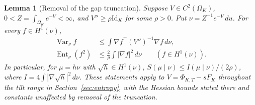 \documentclass[11pt,reqno]{amsart}
\numberwithin{equation}{section}
\newtheorem{lemma}[theorem]{Lemma}
\theoremstyle{definition}
\theoremstyle{remark}
\newcommand{\1}{\mathbf 1}
\newcommand{\Var}{\operatorname{Var}}
\newcommand{\Ent}{\operatorname{Ent}}
\newcommand{\Id}{\mathrm{Id}}
\newcommand{\dd}{\,d}
\begin{document}
\begin{samepage}
\begin{lemma}[Removal of the gap truncation]\label{lem:convex-approx}
Suppose $V\in C^2(\Omega_K)$, $0<Z=\int_{\Omega_K}e^{-V}<\infty$,
and $V''\ge\rho\Id_K$ for some $\rho>0$.
Put $\nu=Z^{-1}e^{-V}\dd u$. For every $f\in H^1(\nu)$,
\begin{align}
\Var_\nu f
&\le\int\nabla f^\top(V'')^{-1}\nabla f\dd\nu,
\label{eq:appendix-bl}\\
\Ent_\nu(f^2)
&\le\frac2\rho\int|\nabla f|^2\dd\nu
\qquad(f\in H^1(\nu)).\label{eq:appendix-lsi}
\end{align}
In particular, for $\mu=h\nu$ with $\sqrt h\in H^1(\nu)$,
$S(\mu\mid\nu)\le I(\mu\mid\nu)/(2\rho)$, where
$I=4\int|\nabla\sqrt h|^2\dd\nu$.
These statements apply to $V=\Phi_{K,T}-sF_K$ throughout the tilt
range in Section~\ref{sec:entropy}, with the Hessian bounds stated
there and constants unaffected by removal of the truncation.
\end{lemma}
\end{samepage}
\end{document}
